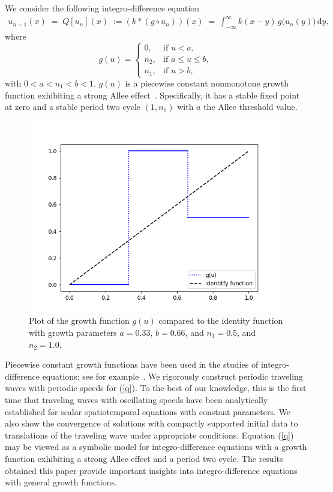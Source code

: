\documentclass[11pt]{article}
\theoremstyle{definition}
\numberwithin{equation}{section}
\numberwithin{thm}{section}
\renewcommand{\a}{a}
\renewcommand{\b}{b}
\newcommand{\m}{n_1}
\newcommand{\mtwo}{n_2}
\begin{document}
We consider the following integro-difference equation
\begin{align}\label{q}
u_{n+1}(x)\;=\;Q[u_n](x)\;:=(k*(g\circ u_n))(x)\;=\,\int^{\infty}_{-\infty}k(x-y)\,g\big(u_n(y)\big)\,\mathrm{d}y,
\end{align}
where 
\begin{equation} \label{g}
g(u) = \begin{cases}
0, & \text{if } u < \a, \\
\mtwo, & \text{if } \a \leq u \leq \b, \\
\m, & \text{if } u > \b,
\end{cases}
\end{equation}
with $0<\a<\m<\b<1$. $g(u)$ is a piecewise constant nonmonotone growth function exhibiting a strong Allee effect~\cite{all}. Specifically, it has a stable fixed point at zero and a stable period two cycle $(1,\m)$ with $\a$ the Allee threshold value.

\begin{figure}[h!]
\centering
  \caption{Plot of the growth function $g(u)$ compared to the identity function with growth parameters $\a=0.33$, $\b=0.66$, and $\m=0.5$, and $\mtwo=1.0$.}
  \includegraphics[width=.8\linewidth]{figures/fig1.png}
\end{figure}

Piecewise constant growth functions have been used in the studies of integro-difference equations; see for example~\cite{kot1, lut,otto,  pnas}. We rigorously construct periodic traveling waves with periodic speeds for (\ref{q}). To the best of our knowledge, this is the first time that traveling waves with oscillating speeds have been analytically established  for scalar spatiotemporal equations with constant parameters. We also show the convergence of solutions with compactly supported initial data to translations of the traveling wave under appropriate conditions. Equation (\ref{q}) may be viewed as a symbolic model for integro-difference equations with a growth function exhibiting a strong Allee effect and a period two cycle. The results obtained this paper provide important insights into integro-difference equations with general growth functions. 
\end{document}
